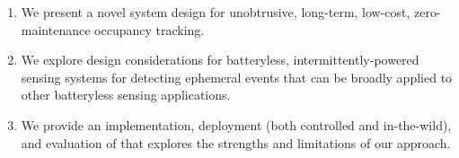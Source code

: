 


\begin{enumerate}[label=\arabic*., align=left, leftmargin=*]
	\item We present a novel system design for unobtrusive, long-term, low-cost, zero-maintenance occupancy tracking.
	\item We explore design considerations for batteryless, intermittently-powered sensing systems for detecting ephemeral events that can be broadly applied to other batteryless sensing applications.
	\item We provide an implementation, deployment (both controlled and in-the-wild), and evaluation of \sysname that explores the strengths and limitations of our approach. 
\end{enumerate}

